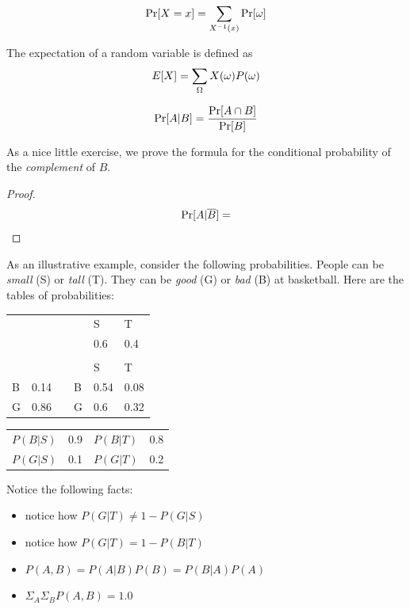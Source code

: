 $$ \operatorname{Pr}[X=x] = \sum_{X^{-1}(x)} \operatorname{Pr}[\omega] $$

\begin{definition}[Expectation]
    The expectation of a random variable is defined as 
    $$ E[X] = \sum_{\Omega} X(\omega)P(\omega)$$ 
\end{definition}

\begin{definition}
    $$ \operatorname{Pr}[A | B] = \frac{\operatorname{Pr}[A \cap B]}{\operatorname{Pr}[B]}$$
\end{definition}

As a nice little exercise, we prove the formula for the conditional probability of the \emph{complement} of $B$.

\begin{proof}
    $$ \operatorname{Pr}[A | \overline{B}] = $$
\end{proof}



As an illustrative example, consider the following probabilities. People can be \emph{small} (S) or \emph{tall} (T). They can be \emph{good} (G) or \emph{bad} (B) at basketball.
Here are the tables of probabilities:

\begin{table}[H]
    \centering
    \begin{tabular}{llllll}
      &      &  &   & S    & T    \\
      &      &  &   & 0.6  & 0.4  \\
      &      &  &   &      &      \\
      &      &  &   & S    & T    \\
    B & 0.14 &  & B & 0.54 & 0.08 \\
    G & 0.86 &  & G & 0.6  & 0.32
    \end{tabular}
\end{table}

\begin{table}[H]
    \centering
    \begin{tabular}{llll}
        $P(B|S)$ & 0.9 & $P(B|T)$ & 0.8 \\
        $P(G|S)$ & 0.1 & $P(G|T)$ & 0.2 
    \end{tabular}
\end{table}

Notice the following facts:
\begin{itemize}
    \item notice how $P(G|T) \neq 1 - P(G|S)$
    \item notice how $P(G|T) = 1 - P(B|T)$
    \item $P(A, B) = P(A|B) P(B) = P(B|A) P(A)$
    \item $ \Sigma_A \Sigma_B P(A, B) = 1.0 $
\end{itemize}

